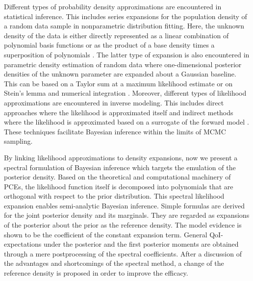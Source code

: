 Different types of probability density approximations are encountered in statistical inference.
This includes series expansions for the population density of a random data sample in nonparametric distribution fitting.
Here, the unknown density of the data is either directly represented as a linear combination of polynomial basis functions \cite{Statistics:Efromovich2010}
or as the product of a base density times a superposition of polynomials \cite{Statistics:Jiang2011}.
The latter type of expansion is also encountered in parametric density estimation of random data
where one-dimensional posterior densities of the unknown parameter are expanded about a Gaussian baseline.
This can be based on a Taylor sum at a maximum likelihood estimate \cite{Bayesian:Johnson1967,Bayesian:Johnson1970}
or on Stein's lemma and numerical integration \cite{Bayesian:Weng2010,Bayesian:Weng2013}.
Moreover, different types of likelihood approximations are encountered in inverse modeling.
This includes direct approaches where the likelihood is approximated itself \cite{Inversion:Orlande2008,Kriging:Dietzel2014}
and indirect methods where the likelihood is approximated based on a surrogate of the forward model \cite{PCE:Marzouk2007,PCE:Marzouk2009:a,PCE:Marzouk2009:b}.
These techniques facilitate Bayesian inference within the limits of MCMC sampling.
\par %
By linking likelihood approximations to density expansions,
now we present a spectral formulation of Bayesian inference which targets the emulation of the posterior density.
Based on the theoretical and computational machinery of PCEs, the likelihood function itself is decomposed into polynomials that are orthogonal with respect to the prior distribution.
This spectral likelihood expansion enables semi-analytic Bayesian inference.
Simple formulas are derived for the joint posterior density and its marginals.
They are regarded as expansions of the posterior about the prior as the reference density.
The model evidence is shown to be the coefficient of the constant expansion term.
General QoI-expectations under the posterior and the first posterior moments are obtained through a mere postprocessing of the spectral coefficients.
After a discussion of the advantages and shortcomings of the spectral method, a change of the reference density is proposed in order to improve the efficacy.

